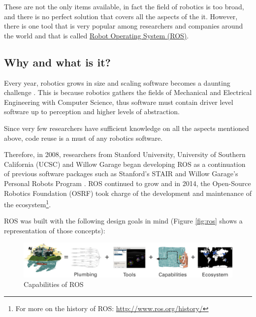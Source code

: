 These are not the only items available, in fact the field of robotics is too broad, and there is no perfect solution that covers all the aspects of the it. However, there is one tool that is very popular among researchers and companies around the world and that is called \href{http://www.ros.org/}{Robot Operating System (ROS)}.

\subsection{Why and what is it?}

Every year, robotics grows in size and scaling software becomes a daunting challenge . This is because robotics gathers the fields of Mechanical and Electrical Engineering with Computer Science, thus software must contain driver level software up to perception and higher levels of abstraction.

Since very few researchers have sufficient knowledge on all the aspects mentioned above, code reuse is a must of any robotics software.

Therefore, in 2008, researchers from Stanford University, University of Southern California (UCSC) and Willow Garage began developing ROS as a continuation of previous software packages such as Stanford's STAIR  and Willow Garage's Personal Robots Program . ROS continued to grow and in 2014, the Open-Source Robotics Foundation (OSRF) took charge of the development and maintenance of the ecosystem\footnote{For more on the history of ROS: \url{http://www.ros.org/history/}}.

ROS was built with the following design goals in mind  (Figure \autoref{fig:ros} shows a representation of those concepts):

\begin{figure}[htb]
  \centering
  \includegraphics[width=\linewidth]{pictures/02/ros_equation}
  \caption{Capabilities of ROS}
  \label{fig:ros}
\end{figure}

